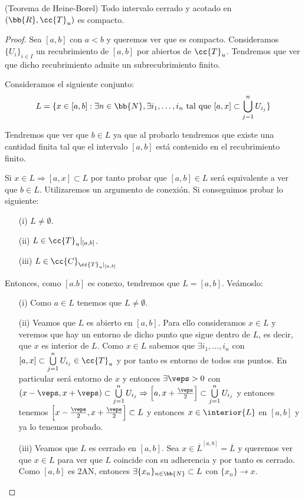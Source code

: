 \begin{teo}
    (Teorema de Heine-Borel) Todo intervalo cerrado y acotado en $(\bb{R}, \cc{T}_u)$ es compacto.

    \begin{proof}
        Sea $[a,b]$ con $a<b$ y queremos ver que es compacto. Consideramos $\{U_i\}_{i\in I}$ un recubrimiento de $[a,b]$ por abiertos de $\cc{T}_u$. Tendremos que ver que dicho recubrimiento admite un subrecubrimiento finito. 

        Consideramos el siguiente conjunto: 
        \begin{align*}
            L=\{x\in [a,b] : \exists n\in \bb{N}, \exists i_1,\dots,i_n \text{ tal que } [a,x]\subset \bigcup\limits_{j=1}^n U_{i_j}\}
        \end{align*}

        Tendremos que ver que $b\in L$ ya que al probarlo tendremos que existe una cantidad finita tal que el intervalo $[a,b]$ está contenido en el recubrimiento finito. 

        Si $x\in L\Rightarrow [a,x]\subset L$ por tanto probar que $[a,b]\in L$ será equivalente a ver que $b\in L$. Utilizaremos un argumento de conexión. Si conseguimos probar lo siguiente:
        \begin{enumerate}
            \item[(i)] $L\neq \emptyset$.
            \item[(ii)] $L\in \cc{T}_u|_{[a,b]}$.
            \item[(iii)] $L\in \cc{C}_{\cc{T}_u|_{[a,b]}}$
        \end{enumerate}
        Entonces, como $[a.b]$ es conexo, tendremos que $L=[a,b]$. Veámoslo:

        \begin{enumerate}
            \item[(i)] Como $a\in L$ tenemos que $L\neq \emptyset$.
            \item[(ii)] Veamos que $L$ es abierto en $[a,b]$. Para ello consideramos $x\in L$ y veremos que hay un entorno de dicho punto que sigue dentro de $L$, es decir, que $x$ es interior de $L$. Como $x\in L$ sabemos que $\exists i_1,\dots,i_n$ con $[a,x]\subset \bigcup\limits_{j=1}^n U_{i_j}\in \cc{T}_u$ y por tanto es entorno de todos sus puntos. En particular será entorno de $x$ y entonces $\exists \veps >0$ con $(x-\veps,x+\veps)\subset \bigcup\limits_{j=1}^n U_{i_j}\Rightarrow \left[a,x+\frac{\veps}{2}\right]\subset \bigcup\limits_{j=1}^n U_{i_j}$ y entonces tenemos $\left[x-\frac{\veps}{2}, x+\frac{\veps}{2}\right]\subset L$ y entonces $x\in \interior{L}$ en $[a,b]$ y ya lo tenemos probado.
            \item[(iii)] Veamos que $L$ es cerrado en $[a,b]$. Sea $x\in \overline{L}^{[a,b]} = \overline{L}$ y queremos ver que $x\in L$ para ver que $L$ coincide con su adherencia y por tanto es cerrado. Como $[a,b]$ es 2AN, entonces $\exists \{x_n\}_{n\in \bb{N}}\subset L $ con $\{x_n\}\to x$. 
            

\end{enumerate}
\end{proof}
\end{teo}

